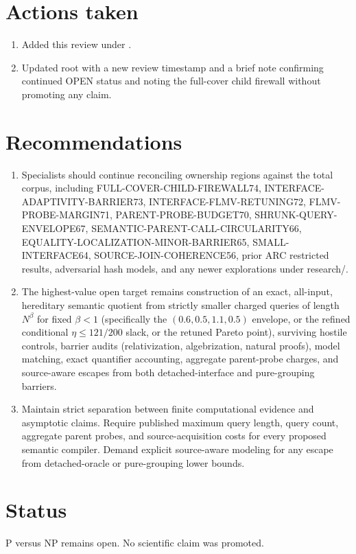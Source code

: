\documentclass[11pt]{article}
\begin{document}
\section{Actions taken}
\begin{enumerate}
\item Added this review under .
\item Updated root  with a new review timestamp and a brief note confirming continued OPEN status and noting the full-cover child firewall without promoting any claim.
\end{enumerate}

\section{Recommendations}
\begin{enumerate}
\item Specialists should continue reconciling ownership regions against the total corpus, including FULL-COVER-CHILD-FIREWALL74, INTERFACE-ADAPTIVITY-BARRIER73, INTERFACE-FLMV-RETUNING72, FLMV-PROBE-MARGIN71, PARENT-PROBE-BUDGET70, SHRUNK-QUERY-ENVELOPE67, SEMANTIC-PARENT-CALL-CIRCULARITY66, EQUALITY-LOCALIZATION-MINOR-BARRIER65, SMALL-INTERFACE64, SOURCE-JOIN-COHERENCE56, prior ARC restricted results, adversarial hash models, and any newer explorations under research/.
\item The highest-value open target remains construction of an exact, all-input, hereditary semantic quotient from strictly smaller charged queries of length $N^\beta$ for fixed $\beta<1$ (specifically the $(0.6,0.5,1.1,0.5)$ envelope, or the refined conditional $\eta\le 121/200$ slack, or the retuned Pareto point), surviving hostile controls, barrier audits (relativization, algebrization, natural proofs), model matching, exact quantifier accounting, aggregate parent-probe charges, and source-aware escapes from both detached-interface and pure-grouping barriers.
\item Maintain strict separation between finite computational evidence and asymptotic claims. Require published maximum query length, query count, aggregate parent probes, and source-acquisition costs for every proposed semantic compiler. Demand explicit source-aware modeling for any escape from detached-oracle or pure-grouping lower bounds.
\end{enumerate}

\section{Status}
P versus NP remains open. No scientific claim was promoted.

\end{document}
